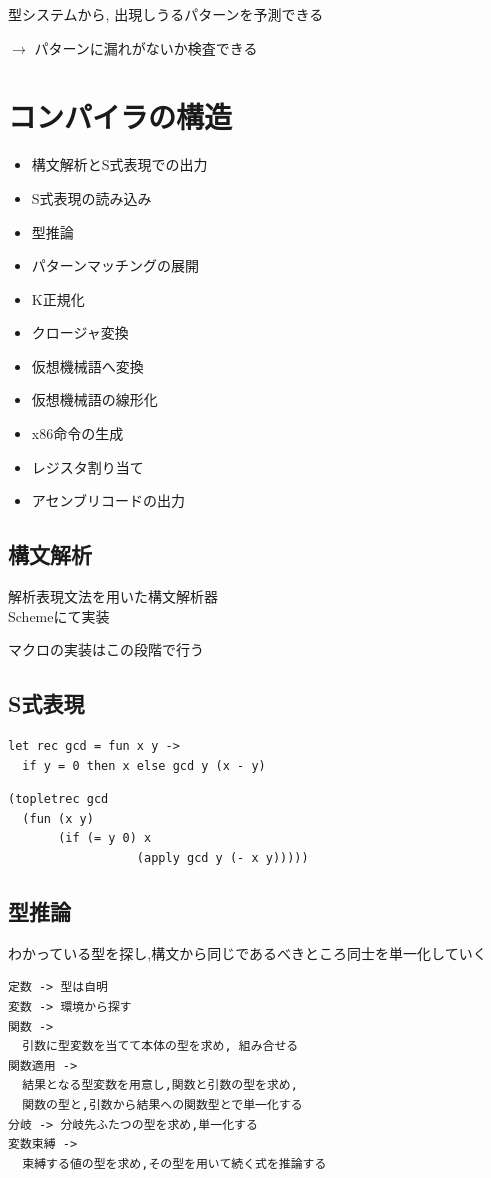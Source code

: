 \documentclass[papersize,30pt,slide]{jsarticle}
\begin{document}
型システムから, 出現しうるパターンを予測できる 

\hspace{1em} $\rightarrow$ パターンに漏れがないか検査できる

\section{コンパイラの構造}

\begin{itemize}
\item 構文解析とS式表現での出力 
\item S式表現の読み込み
\item 型推論
\item パターンマッチングの展開
\item K正規化
\item クロージャ変換
\item 仮想機械語へ変換
\item 仮想機械語の線形化
\item x86命令の生成
\item レジスタ割り当て
\item アセンブリコードの出力
\end{itemize}

\newpage

\subsection{構文解析}
解析表現文法を用いた構文解析器 \\
Schemeにて実装

マクロの実装はこの段階で行う

\subsection{S式表現}
\begin{verbatim}
let rec gcd = fun x y ->
  if y = 0 then x else gcd y (x - y)
\end{verbatim}

\begin{verbatim}
(topletrec gcd
  (fun (x y)
       (if (= y 0) x
                  (apply gcd y (- x y)))))
\end{verbatim}

\newpage
\subsection{型推論}
わかっている型を探し,構文から同じであるべきところ同士を単一化していく
\begin{verbatim}
定数 -> 型は自明
変数 -> 環境から探す
関数 ->
  引数に型変数を当てて本体の型を求め, 組み合せる
関数適用 ->
  結果となる型変数を用意し,関数と引数の型を求め,
  関数の型と,引数から結果への関数型とで単一化する
分岐 -> 分岐先ふたつの型を求め,単一化する
変数束縛 ->
  束縛する値の型を求め,その型を用いて続く式を推論する
\end{verbatim}
\end{document}
